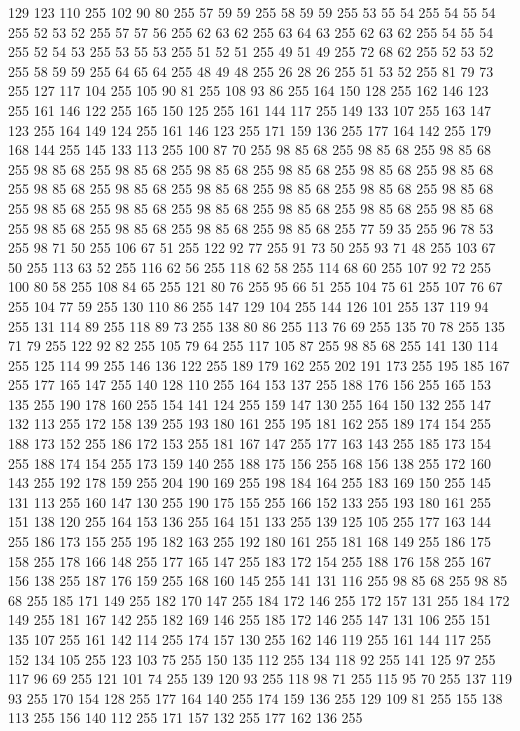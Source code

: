129 123 110 255 102 90 80 255 57 59 59 255 58 59 59 255 53 55 54 255 54 55 54 255 52 53 52 255 57 57 56 255 62 63 62 255 63 64 63 255 62 63 62 255 54 55 54 255 52 54 53 255 53 55 53 255 51 52 51 255 49 51 49 255 72 68 62 255 52 53 52 255 58 59 59 255 64 65 64 255 48 49 48 255 26 28 26 255 51 53 52 255 81 79 73 255 127 117 104 255 105 90 81 255 108 93 86 255 164 150 128 255 162 146 123 255 161 146 122 255 165 150 125 255 161 144 117 255 149 133 107 255 163 147 123 255 164 149 124 255 161 146 123 255 171 159 136 255 177 164 142 255 179 168 144 255 145 133 113 255 100 87 70 255 98 85 68 255 98 85 68 255 98 85 68 255 98 85 68 255 98 85 68 255 98 85 68 255 98 85 68 255 98 85 68 255 98 85 68 255 98 85 68 255 98 85 68 255 98 85 68 255 98 85 68 255 98 85 68 255 98 85 68 255 98 85 68 255 98 85 68 255 98 85 68 255 98 85 68 255 98 85 68 255 98 85 68 255 98 85 68 255 98 85 68 255
98 85 68 255 98 85 68 255 77 59 35 255 96 78 53 255 98 71 50 255 106 67 51 255 122 92 77 255 91 73 50 255 93 71 48 255 103 67 50 255 113 63 52 255 116 62 56 255 118 62 58 255 114 68 60 255 107 92 72 255 100 80 58 255 108 84 65 255 121 80 76 255 95 66 51 255 104 75 61 255 107 76 67 255 104 77 59 255 130 110 86 255 147 129 104 255 144 126 101 255 137 119 94 255 131 114 89 255 118 89 73 255 138 80 86 255 113 76 69 255 135 70 78 255 135 71 79 255 122 92 82 255 105 79 64 255 117 105 87 255 98 85 68 255 141 130 114 255 125 114 99 255 146 136 122 255 189 179 162 255 202 191 173 255 195 185 167 255 177 165 147 255 140 128 110 255 164 153 137 255 188 176 156 255 165 153 135 255 190 178 160 255 154 141 124 255 159 147 130 255 164 150 132 255 147 132 113 255 172 158 139 255 193 180 161 255 195 181 162 255 189 174 154 255 188 173 152 255 186 172 153 255 181 167 147 255 177 163 143 255 185 173 154 255 188 174 154 255 173 159 140 255 188 175 156 255
168 156 138 255 172 160 143 255 192 178 159 255 204 190 169 255 198 184 164 255 183 169 150 255 145 131 113 255 160 147 130 255 190 175 155 255 166 152 133 255 193 180 161 255 151 138 120 255 164 153 136 255 164 151 133 255 139 125 105 255 177 163 144 255 186 173 155 255 195 182 163 255 192 180 161 255 181 168 149 255 186 175 158 255 178 166 148 255 177 165 147 255 183 172 154 255 188 176 158 255 167 156 138 255 187 176 159 255 168 160 145 255 141 131 116 255 98 85 68 255 98 85 68 255 185 171 149 255 182 170 147 255 184 172 146 255 172 157 131 255 184 172 149 255 181 167 142 255 182 169 146 255 185 172 146 255 147 131 106 255 151 135 107 255 161 142 114 255 174 157 130 255 162 146 119 255 161 144 117 255 152 134 105 255 123 103 75 255 150 135 112 255 134 118 92 255 141 125 97 255 117 96 69 255 121 101 74 255 139 120 93 255 118 98 71 255 115 95 70 255 137 119 93 255 170 154 128 255 177 164 140 255 174 159 136 255 129 109 81 255 155 138 113 255 156 140 112 255 171 157 132 255 177 162 136 255

